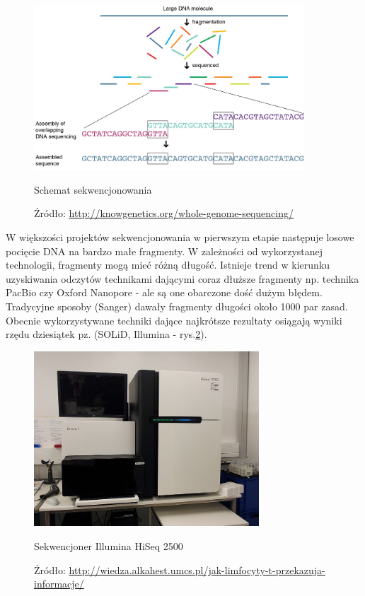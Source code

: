 \begin{figure}[h]
	\centering
	\includegraphics[width=0.9\textwidth]{img/sequenctioning-process.png}
	\caption{Schemat sekwencjonowania}
	\vspace{-0.5cm}
	\caption*{\scriptsize Źródło: \url{http://knowgenetics.org/whole-genome-sequencing/}}
	\label{img:schemat-sekwencjonowania}
\end{figure}

W większości projektów sekwencjonowania w pierwszym etapie następuje losowe pocięcie DNA na bardzo małe fragmenty.
W zależności od wykorzystanej technologii, fragmenty mogą mieć różną długość.
Istnieje trend w kierunku uzyskiwania odczytów technikami dającymi coraz dłuższe fragmenty np. technika PacBio czy Oxford Nanopore - ale są one obarczone dość dużym błędem. 
Tradycyjne sposoby (Sanger) dawały fragmenty długości około 1000 par zasad. Obecnie wykorzystywane techniki dające najkrótsze rezultaty osiągają wyniki rzędu dziesiątek pz. (SOLiD, Illumina - rys.\ref{img:sekwencjoner-illumina}).

\begin{figure}[h]
	\centering
	\includegraphics[width=0.75\textwidth]{img/sekwencjoner-illumina.jpg}
	\caption{Sekwencjoner Illumina HiSeq 2500}
	\vspace{-0.5cm}
	\caption*{\scriptsize Źródło: \url{http://wiedza.alkahest.umcs.pl/jak-limfocyty-t-przekazuja-informacje/}}
	\label{img:sekwencjoner-illumina}
\end{figure}

